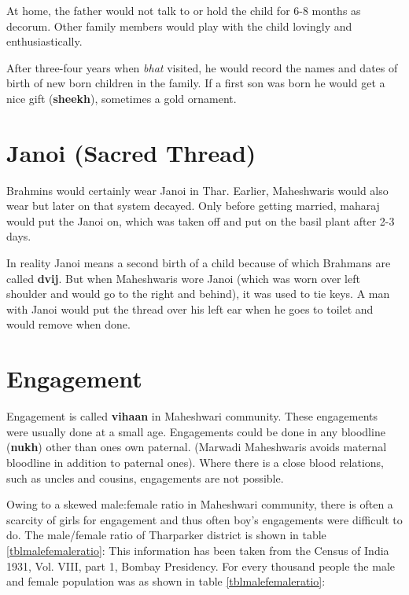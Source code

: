 At home, the father would not talk to or hold the child for 6-8 months as
decorum. Other family members would play with the child lovingly and
enthusiastically.

After three-four years when \textit{bhat} visited, he would record the names
and dates of birth of new born children in the family. If a first son was born
he would get a nice gift (\textbf{sheekh}), sometimes a gold ornament.

\section{Janoi (Sacred Thread)}
Brahmins would certainly wear Janoi in Thar. Earlier, Maheshwaris would also
wear but later on that system decayed. Only before getting married, maharaj
would put the Janoi on, which was taken off and put on the basil plant after 2-3
days.

In reality Janoi means a second birth of a child because of which Brahmans are
called \textbf{dvij}. But when Maheshwaris wore Janoi (which was worn over left
shoulder and would go to the right and behind), it was used to tie keys. A man
with Janoi would put the thread over his left ear when he goes to toilet and
would remove when done.

\section{Engagement}
Engagement is called \textbf{vihaan} in Maheshwari community. These
engagements were usually done at a small age. Engagements could be done in any
bloodline (\textbf{nukh}) other than ones own paternal. (Marwadi Maheshwaris
avoids maternal bloodline in addition to paternal ones). Where there is a close
blood relations, such as uncles and cousins, engagements are not possible.

Owing to a skewed male:female ratio in Maheshwari community, there is often a
scarcity of girls for engagement and thus often boy's engagements were
difficult to do.
The male/female ratio of Tharparker district is shown in table \ref{tblmalefemaleratio}: This information
has been taken from the Census of India 1931, Vol. VIII, part 1, Bombay
Presidency. For every thousand people the male and female population was as
shown in table \ref{tblmalefemaleratio}:

